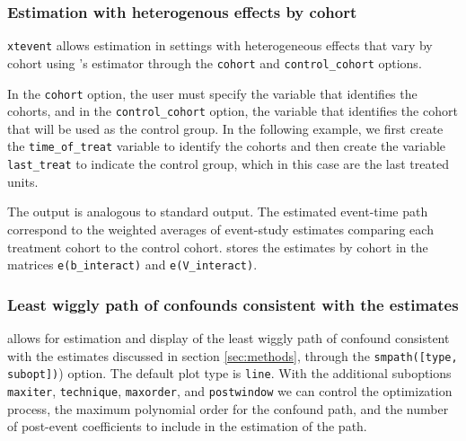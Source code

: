 \documentclass[bib]{./sty/statapress}
\begin{document}
\subsubsection*{Estimation with heterogenous effects by cohort}

\begin{sloppypar}
\texttt{xtevent} allows estimation in settings with heterogeneous effects that vary by cohort using \citet{sun2021estimating}'s estimator through the \texttt{cohort} and \texttt{control\_cohort} options.
\end{sloppypar}
In the \texttt{cohort} option, the user must specify the variable that identifies the cohorts, and in the \texttt{control\_cohort} option, the variable that identifies the cohort that will be used as the control group.
In the following example, we first create the \texttt{time\_of\_treat} variable to identify the cohorts and then create the variable \texttt{last\_treat} to indicate the control group, which in this case are the last treated units.

\begin{stlog}
\nullskip
\end{stlog}

The output is analogous to standard \xtevent output.
The estimated event-time path correspond to the weighted averages of event-study estimates comparing each treatment cohort to the control cohort.
\xtevent stores the estimates by cohort in the matrices \texttt{e(b\_interact)} and \texttt{e(V\_interact)}.

\subsubsection*{Least wiggly path of confounds consistent with the estimates}

\xteventplot allows for estimation and display of the least wiggly path of confound consistent with the estimates discussed in section \ref{sec:methods}, through the \texttt{smpath([type, subopt])}) option.
The default plot type is \texttt{line}.
With the additional suboptions \texttt{maxiter}, \texttt{technique}, \texttt{maxorder}, and \texttt{postwindow} we can control the optimization process, the maximum polynomial order for the confound path, and the number of post-event coefficients to include in the estimation of the path.

\begin{stlog}
\nullskip
\end{stlog}
\end{document}
